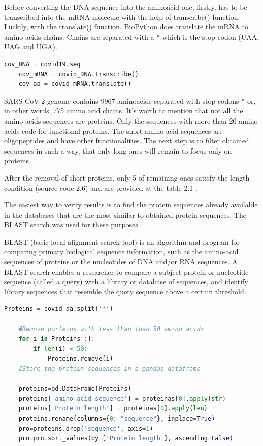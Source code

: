 Before converting the DNA sequence into the aminoacid one, firstly, has to be transcribed into the mRNA molecule \cite{rnaseqexp} with the help of transcribe() function.
Luckily, with the translate() function, BioPython does translate the mRNA to amino acids chains. 
Chains are separated with a * which is the stop codon (UAA, UAG and UGA).

\begin{lstlisting}[language=Python, caption=Transcription and translation using BioPython]
    cov_DNA = covid19.seq
    cov_mRNA = covid_DNA.transcribe()
    cov_aa = covid_mRNA.translate()
\end{lstlisting}

SARS-CoV-2 genome contains 9967 aminoacids separated with stop codons * or, in other words, 775 amino acid chains.
It's worth to mention that not all the amino acids sequences are proteins. 
Only the sequences with more than 20 amino acids code for functional proteins. 
The short amino acid sequences are oligopeptides and have other functionalities. 
The next step is to filter obtained sequences in such a way, that only long ones will remain to focus only on proteins.

After the removal of short proteins, only 5 of remaining ones satisfy the length condition (source code 2.6) and are provided at the table 2.1 .

The easiest way to verify results is to find the protein sequences already available in the databases that are the most similar to obtained protein sequences. 
The BLAST search was used for these purposes.

BLAST (basic local alignment search tool) is an algorithm and program for comparing primary biological sequence information, such as the amino-acid sequences of proteins or the nucleotides of DNA and/or RNA sequences. 
A BLAST search enables a researcher to compare a subject protein or nucleotide sequence (called a query) with a library or database of sequences, and identify library sequences that resemble the query sequence above a certain threshold.

\begin{lstlisting}[language=Python, caption=Filtering aminoacid sequences and storing them in a dataframe]
    Proteins = covid_aa.split('*')

    #Remove porteins with less than than 50 amino acids
    for i in Proteins[:]:
        if len(i) < 50:
            Proteins.remove(i)
    #Store the protein sequences in a pandas dataframe

    proteins=pd.DataFrame(Proteins)
    proteins['amino acid sequence'] = proteinas[0].apply(str)
    proteins['Protein length'] = proteinas[0].apply(len)
    proteins.rename(columns={0: "sequence"}, inplace=True)
    pro=proteins.drop('sequence', axis=1)
    pro=pro.sort_values(by=['Protein length'], ascending=False)
\end{lstlisting}

